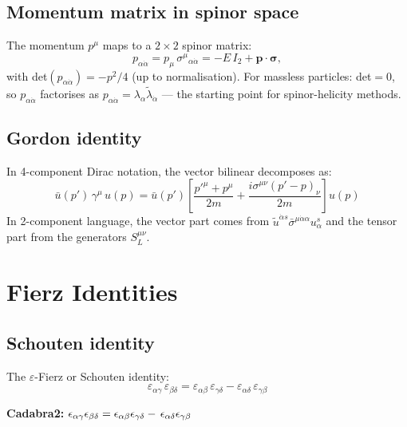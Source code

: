 \documentclass[12pt]{article}
\begin{document}
\subsection{Momentum matrix in spinor space}

The momentum $p^\mu$ maps to a $2\times2$ spinor matrix:
\begin{equation}
  p_{\alpha\dot\alpha} = p_\mu\,\sigma^\mu{}_{\alpha\dot\alpha}
  = -E\,I_2 + \mathbf{p}\cdot\boldsymbol\sigma,
\end{equation}
with det$(p_{\alpha\dot\alpha}) = -p^2/4$ (up to normalisation).
For massless particles: det$=0$, so $p_{\alpha\dot\alpha}$ factorises as
$p_{\alpha\dot\alpha} = \lambda_\alpha\tilde\lambda_{\dot\alpha}$ ---
the starting point for spinor-helicity methods.

\subsection{Gordon identity}

In 4-component Dirac notation, the vector bilinear decomposes as:
\begin{equation}
  \bar u(p')\,\gamma^\mu\,u(p)
  = \bar u(p')\!\left[\frac{p'^\mu+p^\mu}{2m}
    + \frac{i\sigma^{\mu\nu}(p'-p)_\nu}{2m}\right]\!u(p)
\end{equation}
In 2-component language, the vector part comes from
$\tilde u^{\dot\alpha s}\bar\sigma^{\mu\dot\alpha\alpha}u^s_\alpha$
and the tensor part from the generators $S^{\mu\nu}_L$.

\section{Fierz Identities}

\subsection{Schouten identity}

The $\varepsilon$-Fierz or Schouten identity:
\begin{equation}
  \boxed{
    \varepsilon_{\alpha\gamma}\,\varepsilon_{\beta\delta}
    = \varepsilon_{\alpha\beta}\,\varepsilon_{\gamma\delta}
    - \varepsilon_{\alpha\delta}\,\varepsilon_{\gamma\beta}
  }
  \tag{38.17}
\end{equation}

\textbf{Cadabra2:} $\epsilon_{\alpha \gamma} \epsilon_{\beta \delta} = \epsilon_{\alpha \beta} \epsilon_{\gamma \delta}\discretionary{}{}{}-\,\epsilon_{\alpha \delta} \epsilon_{\gamma \beta}$
\end{document}
